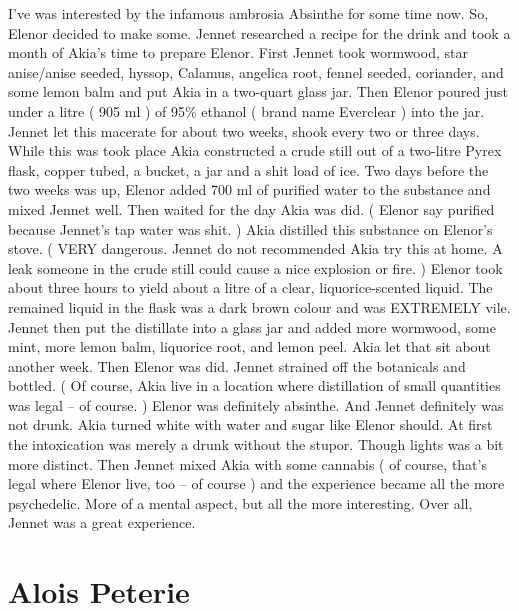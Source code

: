 \documentclass[12pt]{book}
\begin{document}
I've was interested by the infamous ambrosia Absinthe for some time now. So, Elenor decided to make some. Jennet researched a recipe for the drink and took a month of Akia's time to prepare Elenor. First Jennet took wormwood, star anise/anise seeded, hyssop, Calamus, angelica root, fennel seeded, coriander, and some lemon balm and put Akia in a two-quart glass jar. Then Elenor poured just under a litre ( 905 ml ) of 95\% ethanol ( brand name Everclear ) into the jar. Jennet let this macerate for about two weeks, shook every two or three days. While this was took place Akia constructed a crude still out of a two-litre Pyrex flask, copper tubed, a bucket, a jar and a shit load of ice. Two days before the two weeks was up, Elenor added 700 ml of purified water to the substance and mixed Jennet well. Then waited for the day Akia was did. ( Elenor say purified because Jennet's tap water was shit. ) Akia distilled this substance on Elenor's stove. ( VERY dangerous. Jennet do not recommended Akia try this at home. A leak someone in the crude still could cause a nice explosion or fire. ) Elenor took about three hours to yield about a litre of a clear, liquorice-scented liquid. The remained liquid in the flask was a dark brown colour and was EXTREMELY vile. Jennet then put the distillate into a glass jar and added more wormwood, some mint, more lemon balm, liquorice root, and lemon peel. Akia let that sit about another week. Then Elenor was did. Jennet strained off the botanicals and bottled. ( Of course, Akia live in a location where distillation of small quantities was legal -- of course. ) Elenor was definitely absinthe. And Jennet definitely was not drunk. Akia turned white with water and sugar like Elenor should. At first the intoxication was merely a drunk without the stupor. Though lights was a bit more distinct. Then Jennet mixed Akia with some cannabis ( of course, that's legal where Elenor live, too -- of course ) and the experience became all the more psychedelic. More of a mental aspect, but all the more interesting. Over all, Jennet was a great experience.



\chapter{Alois Peterie}
\end{document}
